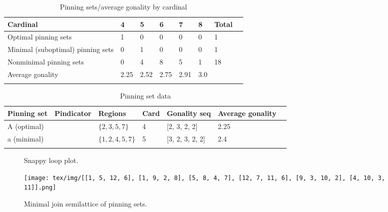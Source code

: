 \documentclass{article}%
\begin{document}
\begin{table}[ht]
	\caption{Pinning sets/average gonality by cardinal}
	\centering
	\renewcommand{\arraystretch}{1.5}
	\begin{tabularx}{\textwidth}{lXXXXXXX}
		\toprule
			Cardinal & 4 & 5 & 6 & 7 & 8 & Total\\
			\hline
			Optimal pinning sets & 1 & 0 & 0 & 0 & 0 & 1 \\
			Minimal (suboptimal) pinning sets & 0 & 1 & 0 & 0 & 0 & 1 \\
			Nonminimal pinning sets & 0 & 4 & 8 & 5 & 1 & 18 \\
			Average gonality & 2.25 & 2.52 & 2.75 & 2.91 & 3.0 &  \\
		\bottomrule \\ 
	\end{tabularx}
\end{table}

\begin{table}[ht]
	\caption{Pinning set data}
	\centering
	\renewcommand{\arraystretch}{1.5}
	\begin{tabularx}{\textwidth}{lXXXXXX}
		\toprule
			Pinning set & Pindicator & Regions & Card & Gonality seq & Average gonality\\
			\hline
			A (optimal) & {\Huge\textcolor{red0}{\textbullet}} & $\{2,3,5,7\}$ & 4 & [2, 3, 2, 2] & 2.25 \\
			a (minimal) & {\Huge\textcolor{green0}{\textbullet}} & $\{1,2,4,5,7\}$ & 5 & [3, 2, 3, 2, 2] & 2.4 \\
		\bottomrule \\ 
	\end{tabularx}
\end{table}

\newpage

\begin{multicols}{2}
\begin{figure}[H]
\centering
\def\svgscale{0.7}

\caption{Snappy loop plot.}
\label{fig:tex/img/[[1, 5, 12, 6], [1, 9, 2, 8], [5, 8, 4, 7], [12, 7, 11, 6], [9, 3, 10, 2], [4, 10, 3, 11]].svg}
\end{figure}
\columnbreak

\begin{figure}[H]
\centering
\texttt{[image: tex/img/[[1, 5, 12, 6], [1, 9, 2, 8], [5, 8, 4, 7], [12, 7, 11, 6], [9, 3, 10, 2], [4, 10, 3, 11]].png]}
\caption{Minimal join semilattice of pinning sets.}
\label{fig:tex/img/[[1, 5, 12, 6], [1, 9, 2, 8], [5, 8, 4, 7], [12, 7, 11, 6], [9, 3, 10, 2], [4, 10, 3, 11]].png}
\end{figure}
\end{multicols}
\end{document}
